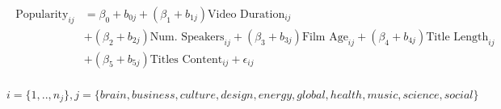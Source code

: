 \begin{align}
\begin{split}
\text{Popularity}_{ij}&=\beta_0+b_{0j}+(\beta_1+b_{1j})\text{Video Duration}_{ij}\\
&+(\beta_2+b_{2j})\text{Num. Speakers}_{ij}+(\beta_3+b_{3j})\text{Film Age}_{ij}+(\beta_4+b_{4j})\text{Title Length}_{ij}\\
&+(\beta_5+b_{5j})\text{Titles Content}_{ij}+\epsilon_{ij}\\
\end{split}
\label{linear_mixed_themes_eqn}
\end{align}

\begin{equation*}
i=\{1,..,n_j\}, j=\{brain, business, culture, design, energy, global, health, music, science, social\}
\end{equation*}